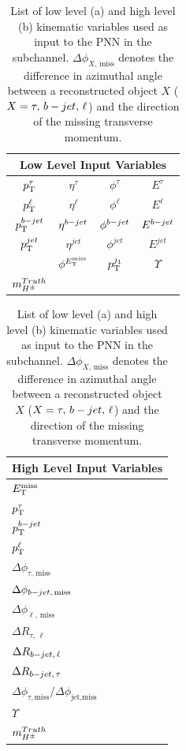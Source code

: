       \begin{table}[!thp]
				\begin{subtable}[c]{0.25\textwidth}
					\centering
					\begin{tabular}{| c | c | c | c |}
		        \multicolumn{4}{c}{\textbf{Low Level Input Variables}} \\ \hline \hline
		        $p_{\text{T}}^{\tau}$ & $\eta^{\tau}$ & $\phi^{\tau}$ & $E^{\tau}$ \\ \hline
		        $p_{\text{T}}^{\ell}$ & $\eta^{\ell}$ & $\phi^{\ell}$ & $E^{\ell}$ \\ \hline
		        $p_{\text{T}}^{b-jet}$ & $\eta^{b-jet}$ & $\phi^{b-jet}$ & $E^{b-jet}$ \\ \hline
		        $p_{\text{T}}^{jet}$ & $\eta^{jet}$ & $\phi^{jet}$ & $E^{jet}$ \\ \hline
		        \Etm & $\phi^{E_\text{T}^\text{miss}}$ & $p_{\text{T}}^{j_{1}}$ & $\Upsilon$  \\ \hline
		        $m_{H^{\pm}}^{Truth}$ & & & \\ \hline 
	        \end{tabular}
	      \end{subtable}

				\begin{subtable}[c]{0.25\textwidth}
					\centering
					\begin{tabular}{| l |}
						\hline
						\textbf{High Level Input Variables} \\
						\hline \hline
						$E_\text{T}^\text{miss}$  \\
						$p_{\text{T}}^{\tau}$  \\
						$p_{\text{T}}^{b-jet}$  \\
						$p_{\text{T}}^{\ell}$  \\
						$\Delta \phi_{\tau,\,\text{miss}}$  \\
						$\Delta \phi_{b-jet,\,\text{miss}}$  \\
						$\Delta \phi_{\ell,\,\text{miss}}$  \\
						$\Delta R_{\tau,\,\ell}$ \\
						$\Delta R_{b-jet,\,\ell}$ \\
						$\Delta R_{b-jet,\,\tau}$ \\
						$\Delta \phi_{\tau, \text{miss}} / \Delta \phi_{\text{jet}, \text{miss}}$  \\
						$\Upsilon$ \\
						$m_{H^{\pm}}^{Truth}$ \\ \hline
					\end{tabular}
				\end{subtable}
				\caption{List of low level (a) and high level (b) kinematic variables used as input to the \gls{PNN} in the \taulep subchannel. $\Delta \phi_{X,\,\text{miss}}$ denotes the difference in azimuthal angle between a reconstructed object $X$ ($X = \tau,\,b-jet,\,\ell$) and the direction of the missing transverse momentum.}
				\label{tab:taulep-input-variables-high-v-low}
			\end{table}

